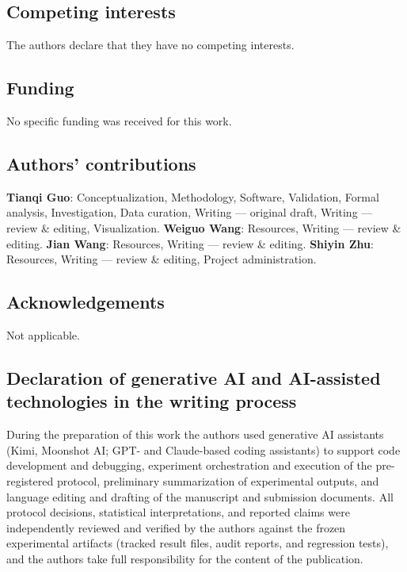 \documentclass[pdflatex,sn-basic,Numbered]{sn-jnl}
\begin{document}
\subsection*{Competing interests}
The authors declare that they have no competing interests.

\subsection*{Funding}
No specific funding was received for this work.

\subsection*{Authors' contributions}
\textbf{Tianqi Guo}: Conceptualization, Methodology, Software, Validation,
Formal analysis, Investigation, Data curation, Writing --- original draft,
Writing --- review \& editing, Visualization.
\textbf{Weiguo Wang}: Resources, Writing --- review \& editing.
\textbf{Jian Wang}: Resources, Writing --- review \& editing.
\textbf{Shiyin Zhu}: Resources, Writing --- review \& editing, Project
administration.

\subsection*{Acknowledgements}
Not applicable.

\subsection*{Declaration of generative AI and AI-assisted technologies in the
writing process}
During the preparation of this work the authors used generative AI assistants
(Kimi, Moonshot AI; GPT- and Claude-based coding assistants) to support code
development and debugging, experiment orchestration and execution of the
pre-registered protocol, preliminary summarization of experimental outputs,
and language editing and drafting of the manuscript and submission documents.
All protocol decisions, statistical interpretations, and reported claims were
independently reviewed and verified by the authors against the frozen
experimental artifacts (tracked result files, audit reports, and regression
tests), and the authors take full responsibility for the content of the
publication.
\end{document}
